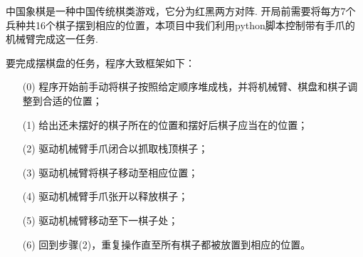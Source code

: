 \documentclass{assignment}
\begin{document}
中国象棋是一种中国传统棋类游戏，它分为红黑两方对阵. 开局前需要将每方7个兵种共16个棋子摆到相应的位置，本项目中我们利用python脚本控制带有手爪的机械臂完成这一任务.

要完成摆棋盘的任务，程序大致框架如下：
\begin{itemize}
    \item[(0)] 程序开始前手动将棋子按照给定顺序堆成栈，并将机械臂、棋盘和棋子调整到合适的位置；
    \item[(1)] 给出还未摆好的棋子所在的位置和摆好后棋子应当在的位置；
    \item[(2)] 驱动机械臂手爪闭合以抓取栈顶棋子；
    \item[(3)] 驱动机械臂将棋子移动至相应位置；
    \item[(4)] 驱动机械臂手爪张开以释放棋子；
    \item[(5)] 驱动机械臂移动至下一棋子处；
    \item[(6)] 回到步骤(2)，重复操作直至所有棋子都被放置到相应的位置。
\end{itemize}
\end{document}
